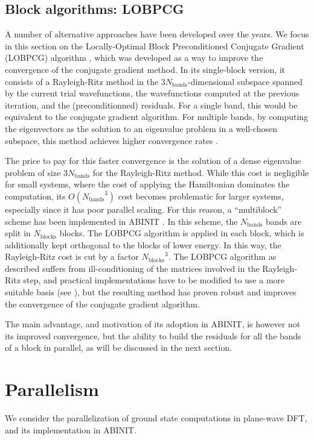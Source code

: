 \documentclass[11pt]{elsarticle}
\newcommand{\nband}{\ensuremath{N_{\text{bands}}}\xspace}
\newcommand{\nblocks}{\ensuremath{N_{\text{blocks}}}\xspace}
\begin{document}
\subsection{Block algorithms: LOBPCG}
A number of alternative approaches have been developed over the
years. We focus in this section on the Locally-Optimal Block
Preconditioned Conjugate Gradient (LOBPCG) algorithm
\cite{knyazev2001toward}, which was developed as a way to improve the
convergence of the conjugate gradient method. In its single-block
version, it consists of a Rayleigh-Ritz method in the
$3\nband$-dimensional subspace spanned by the current trial
wavefunctions, the wavefunctions computed at the previous iteration,
and the (preconditionned) residuals. For a single band, this would be
equivalent to the conjugate gradient algorithm. For multiple bands, by
computing the eigenvectors as the solution to an eigenvalue problem in
a well-chosen subspace, this method achieves higher convergence rates
\cite{knyazev2001toward}.

The price to pay for this faster convergence is the solution of a
dense eigenvalue problem of size $3\nband$ for the Rayleigh-Ritz
method. While this cost is negligible for small systems, where the
cost of applying the Hamiltonian dominates the computation, its
$O(\nband^{3})$ cost becomes problematic for larger systems,
especially since it has poor parallel scaling. For this reason, a
``multiblock'' scheme has been implemented in ABINIT
\cite{bottin2008large}. In this scheme, the $\nband$ bands are split
in $\nblocks$ blocks. The LOBPCG algorithm is applied in each block,
which is additionally kept orthogonal to the blocks of lower
energy. In this way, the Rayleigh-Ritz cost is cut by a factor
$\nblocks^{3}$. The LOBPCG algorithm as described suffers from
ill-conditioning of the matrices involved in the Rayleigh-Ritz step,
and practical implementations have to be modified to use a more
suitable basis (see \cite{knyazev2001toward, hetmaniuk2006basis}), but
the resulting method has proven robust and improves the convergence of
the conjugate gradient algorithm.

The main advantage, and motivation of its adoption in ABINIT, is
however not its improved convergence, but the ability to build the
residuals for all the bands of a block in parallel, as will be
discussed in the next section.
\section{Parallelism}
We consider the parallelization of ground state computations in
plane-wave DFT, and its implementation in ABINIT.
\end{document}
